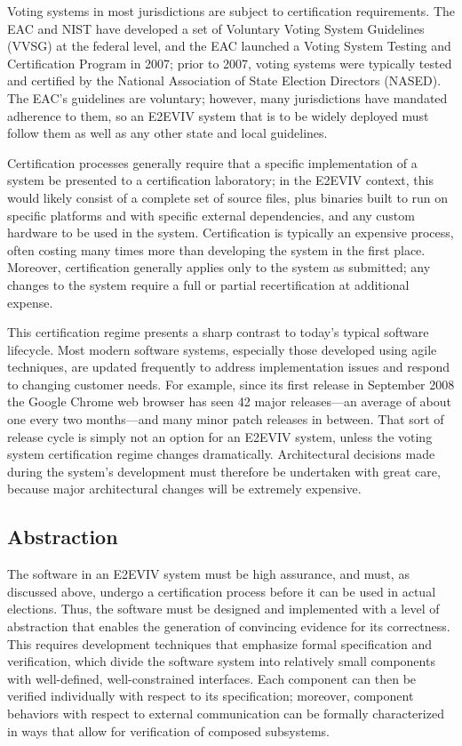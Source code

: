 Voting systems in most jurisdictions are subject to certification
requirements. The EAC and NIST have developed a set of Voluntary
Voting System Guidelines (VVSG) at the federal level, and the EAC
launched a Voting System Testing and Certification Program in 2007;
prior to 2007, voting systems were typically tested and certified by
the National Association of State Election Directors (NASED). The
EAC's guidelines are voluntary; however, many jurisdictions have
mandated adherence to them, so an E2EVIV system that is to be widely
deployed must follow them as well as any other state and local
guidelines.

Certification processes generally require that a specific
implementation of a system be presented to a certification laboratory;
in the E2EVIV context, this would likely consist of a complete set of
source files, plus binaries built to run on specific platforms and
with specific external dependencies, and any custom hardware to be
used in the system. Certification is typically an expensive process,
often costing many times more than developing the system in the first
place. Moreover, certification generally applies only to the system as
submitted; any changes to the system require a full or partial
recertification at additional expense.

This certification regime presents a sharp contrast to today's typical
software lifecycle. Most modern software systems, especially those
developed using agile techniques, are updated frequently to address
implementation issues and respond to changing customer needs. For
example, since its first release in September 2008 the Google Chrome
web browser has seen 42 major releases---an average of about one every
two months---and many minor patch releases in between. That sort of
release cycle is simply not an option for an E2EVIV system, unless the
voting system certification regime changes dramatically.
Architectural decisions made during the system's development must
therefore be undertaken with great care, because major architectural
changes will be extremely expensive.

\subsection{Abstraction}

The software in an E2EVIV system must be high assurance, and must, as
discussed above, undergo a certification process before it can be used
in actual elections. Thus, the software must be designed and
implemented with a level of abstraction that enables the generation of
convincing evidence for its correctness. This requires development
techniques that emphasize formal specification and verification, which
divide the software system into relatively small components with
well-defined, well-constrained interfaces. Each component can then be
verified individually with respect to its specification; moreover,
component behaviors with respect to external communication can be
formally characterized in ways that allow for verification of composed
subsystems.

